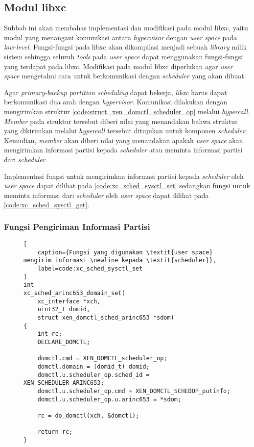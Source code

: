 \subsection{Modul libxc}
\label{section:modul_libxc}

Subbab ini akan membahas implementasi dan modifikasi pada modul libxc, yaitu modul yang
menangani komunikasi antara \textit{hypervisor} dengan \textit{user space} pada
\textit{low-level}. Fungsi-fungsi pada libxc akan dikompilasi menjadi sebuah \textit{library}
milik sistem sehingga seluruh \textit{tools} pada \textit{user space} dapat menggunakan
fungsi-fungsi yang terdapat pada libxc. Modifikasi pada modul libxc diperlukan agar \textit{user
space} mengetahui cara untuk berkomunikasi dengan \textit{scheduler} yang akan dibuat.

Agar \textit{primary-backup partition scheduling} dapat bekerja, \textit{libxc} harus dapat
berkomunikasi dua arah dengan \textit{hypervisor}. Komunikasi dilakukan dengan mengirimkan
struktur \autoref{code:struct_xen_domctl_scheduler_op} melalui \textit{hypercall}.
\textit{Member}  pada struktur tersebut diberi nilai yang menandakan bahwa
struktur yang dikirimkan melalui \textit{hypercall} tersebut ditujukan untuk komponen
\textit{scheduler}. Kemudian, \textit{member}  akan diberi nilai yang menandakan
apakah \textit{user space} akan mengirimkan informasi partisi kepada \textit{scheduler} atau
meminta informasi partisi dari \textit{scheduler}.

Implementasi fungsi untuk mengirimkan informasi partisi kepada \textit{scheduler} oleh \textit{user
space} dapat dilihat pada \autoref{code:xc_sched_sysctl_set} sedangkan fungsi untuk meminta
informasi dari \textit{scheduler} oleh \textit{user space} dapat dilihat pada
\autoref{code:xc_sched_sysctl_get}.

\subsubsection{Fungsi Pengiriman Informasi Partisi}

\begin{figure}[!ht]
\begin{lstlisting}[
	caption={Fungsi yang digunakan \textit{user space} mengirim informasi \newline kepada \textit{scheduler}},
	label=code:xc_sched_sysctl_set
]
int
xc_sched_arinc653_domain_set(
    xc_interface *xch,
    uint32_t domid,
    struct xen_domctl_sched_arinc653 *sdom)
{
    int rc;
    DECLARE_DOMCTL;

    domctl.cmd = XEN_DOMCTL_scheduler_op;
    domctl.domain = (domid_t) domid;
    domctl.u.scheduler_op.sched_id = XEN_SCHEDULER_ARINC653;
    domctl.u.scheduler_op.cmd = XEN_DOMCTL_SCHEDOP_putinfo;
    domctl.u.scheduler_op.u.arinc653 = *sdom;

    rc = do_domctl(xch, &domctl);

    return rc;
}
\end{lstlisting}
\end{figure}

